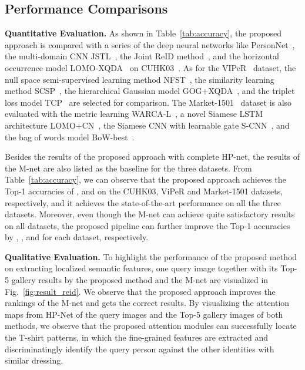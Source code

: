 \documentclass[10pt,twocolumn,letterpaper]{article}
\begin{document}
\subsection{Performance Comparisons}

\noindent\textbf{Quantitative Evaluation.}
As shown in Table~\ref{tab:accuracy}, the proposed approach is compared with a series of the deep neural networks like PersonNet~\cite{wu2016personnet}, the multi-domain CNN JSTL~\cite{xiao2016learning},
the Joint ReID method~\cite{ahmed2015improved}, and the horizontal occurrence model LOMO-XQDA~\cite{liao2015person} on CUHK03~\cite{li2014deepreid}.
As for the VIPeR~\cite{gray2007evaluating} dataset, the null space semi-supervised learning method NFST~\cite{zhang2016learning}, the similarity learning method SCSP~\cite{chen2016similarity}, the hierarchical Gaussian model GOG+XQDA~\cite{matsukawa2016hierarchical},
and the triplet loss model TCP~\cite{cheng2016person} are selected for comparison.
The Market-1501~\cite{zheng2015scalable} dataset is also evaluated with the metric learning WARCA-L~\cite{jose2016scalable}, a novel Siamese LSTM architecture LOMO+CN~\cite{varior2016siamese}, the Siamese CNN with learnable gate S-CNN~\cite{varior2016gated},
and the bag of words model BoW-best~\cite{zheng2015scalable}.

Besides the results of the proposed approach with complete HP-net, the results of the M-net are also listed as the baseline for the three datasets.
From Table~\ref{tab:accuracy}, we can observe that the proposed approach achieves the Top-1 accuracies of ,  and  on the CUHK03, ViPeR and Market-1501 datasets, respectively, and it achieves the state-of-the-art performance on all the three datasets.
Moreover, even though the M-net can achieve quite satisfactory results on all datasets, the proposed pipeline can further improve the Top-1 accuracies by , , and  for each dataset, respectively.


\vspace{+0.1cm}
\noindent\textbf{Qualitative Evaluation.}
To highlight the performance of the proposed method on extracting localized semantic features, one query image together with its Top-5 gallery results by the proposed method and the M-net are visualized in Fig.~\ref{fig:result_reid}.
We observe that the proposed approach improves the rankings of the M-net and gets the correct results.
By visualizing the attention maps from HP-Net of the query images and the Top-5 gallery images of both methods, we observe that the proposed attention modules can successfully locate the T-shirt patterns, in which the fine-grained features are extracted and discriminatingly identify the query person against the other identities with similar dressing.
\
\end{document}

